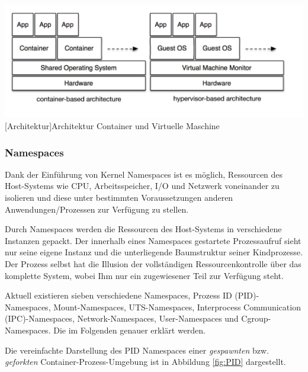 \vspace{1em}
\begin{minipage}{\linewidth}
	\centering
	\includegraphics[width=1\linewidth]{pics/docker2.png}
	[Architektur]{Architektur Container und Virtuelle Maschine \cite{Xavier2015AClouds}}
	\label{fig:architecture}
\end{minipage}

\subsubsection{Namespaces}
Dank der Einführung von Kernel Namespaces ist es möglich, Ressourcen des Host-Systems wie CPU, Arbeitsspeicher, I/O und Netzwerk voneinander zu isolieren und diese unter bestimmten Voraussetzungen anderen Anwendungen/Prozessen zur Verfügung zu stellen. 

Durch Namespaces werden die Ressourcen des Host-Systems in verschiedene Instanzen gepackt. Der innerhalb eines Namespaces gestartete Prozessaufruf sieht nur seine eigene Instanz und die unterliegende Baumstruktur seiner Kindprozesse. Der Prozess selbst hat die Illusion der vollständigen Ressourcenkontrolle über das komplette System, wobei Ihm nur ein zugewiesener Teil zur Verfügung steht.

Aktuell existieren sieben verschiedene Namespaces, Prozess ID (PID)-Namespaces, Mount-Namespaces, UTS-Namespaces, Interprocess Communication (IPC)-Namespaces, Network-Namespaces, User-Namespaces und Cgroup-Namespaces. Die im Folgenden genauer erklärt werden.

Die vereinfachte Darstellung des PID Namespaces einer \emph{gespawnten} bzw. \emph{geforkten} Container-Prozess-Umgebung ist in Abbildung \ref{fig:PID} dargestellt. \cite{Liebel2017SkalierbareContainer-Infrastrukturen}

